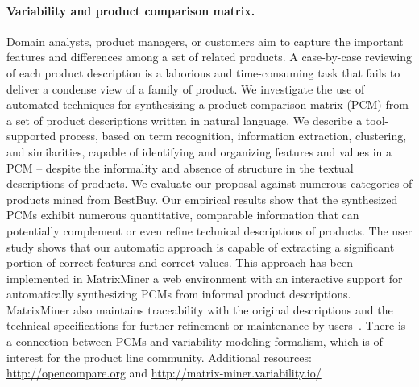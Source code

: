 
\paragraph{Variability and product comparison matrix.}
    Domain analysts, product managers, or customers aim to capture the important features and differences among a set of related products. A case-by-case reviewing of each product description is a laborious and time-consuming task that fails to deliver a condense view of a family of product. We investigate the use of automated techniques for synthesizing a product comparison matrix (PCM) from a set of product descriptions written in natural language. We describe a tool-supported process, based on term recognition, information extraction, clustering, and similarities, capable of identifying and organizing features and values in a PCM – despite the informality and absence of structure in the textual descriptions of products. We evaluate our proposal against numerous categories of products mined from BestBuy. Our empirical results show that the synthesized PCMs exhibit numerous quantitative, comparable information that can potentially complement or even refine technical descriptions of products. The user study shows that our automatic approach is capable of extracting a significant portion of correct features and correct values. This approach has been implemented in MatrixMiner a web environment with an interactive support for automatically synthesizing PCMs from informal product descriptions. MatrixMiner also maintains traceability with the original descriptions and the technical specifications for further refinement or maintenance by users~\cite{JSSbennasr}. 
    There is a connection between PCMs and variability modeling formalism, which is of interest for the product line community.
    Additional resources: \url{http://opencompare.org} and \url{http://matrix-miner.variability.io/}

